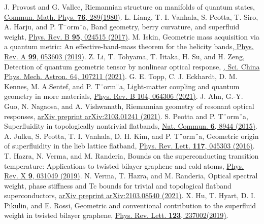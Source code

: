 \documentclass[prl,floatfix,twocolumn,showpacs,amsmath,superscriptaddress]{revtex4-2}
\begin{document}
\begin{thebibliography}{3}
	 J. Provost and G. Vallee,  Riemannian structure on manifolds of quantum states, \href{https://www.nature.com/articles/ncomms9944}{ Commun. Math. Phys. {\bf 76}, 289(1980)}.
	 L. Liang, T. I. Vanhala, S. Peotta, T. Siro, A. Harju, and P. T¨orm¨a, Band geometry, berry curvature, and superfluid weight, \href{https://doi.org/10.1103/PhysRevB.95.024515}{ Phys. Rev. B {\bf 95}, 024515 (2017)}.
	 M. Iskin, Geometric mass acquisition via a quantum metric: An effective-band-mass theorem for the helicity bands,\href{https://doi.org/10.1103/PhysRevA.99.053603}{ Phys. Rev. A {\bf 99}, 053603 (2019)}.
	 Z. Li, T. Tohyama, T. Iitaka, H. Su, and H. Zeng, Detection of quantum geometric tensor by nonlinear optical response, \href{https://arxiv.org/abs/2007.02481}{, Sci. China Phys. Mech. Astron. 64,
		107211 (2021)}.
	 G. E. Topp, C. J. Eckhardt, D. M. Kennes, M. A.Sentef, and P. T¨orm¨a, Light-matter coupling and quantum geometry in more materials, \href{https://arxiv.org/abs/2103.04967}{Phys. Rev. B 104, 064306 (2021)}.
	 J. Ahn, G.-Y. Guo, N. Nagaosa, and A. Vishwanath, Riemannian geometry of resonant optical responses, \href{https://arxiv.org/abs/2103.01241}{ arXiv preprint arXiv:2103.01241 (2021)}.
	 S. Peotta and P. T¨orm¨a, Superfluidity in topologically nontrivial flatbands, \href{https://www.nature.com/articles/ncomms9944}{Nat. Commun. {\bf 6}, 8944 (2015)}.
	 A. Julku, S. Peotta, T. I. Vanhala, D. H. Kim, and P. T¨orm¨a, Geometric origin of superfluidity in the lieb lattice flatband, \href{https://doi.org/10.1103/PhysRevLett.117.045303}{Phys. Rev. Lett. {\bf 117}, 045303 (2016)}.
	 T. Hazra, N. Verma, and M. Randeria, Bounds on the superconducting transition temperature: Applications to twisted bilayer graphene and cold atoms, \href{https://journals.aps.org/prx/abstract/10.1103/PhysRevX.9.031049}{ Phys. Rev. X {\bf 9}, 031049 (2019)}.
	 N. Verma, T. Hazra, and M. Randeria, Optical spectral weight, phase stiffness and Tc bounds for trivial and topological flatband superconductors, \href{https://arxiv.org/abs/2103.08540}{arXiv preprint arXiv:2103.08540 (2021)}.
	 X. Hu, T. Hyart, D. I. Pikulin, and E. Rossi, Geometric and conventional contribution to the superfluid weight in twisted bilayer graphene, \href{https://journals.aps.org/prl/abstract/10.1103/PhysRevLett.123.237002}{Phys. Rev. Lett. {\bf 123}, 237002(2019)}.

\end{thebibliography}
\end{document}
